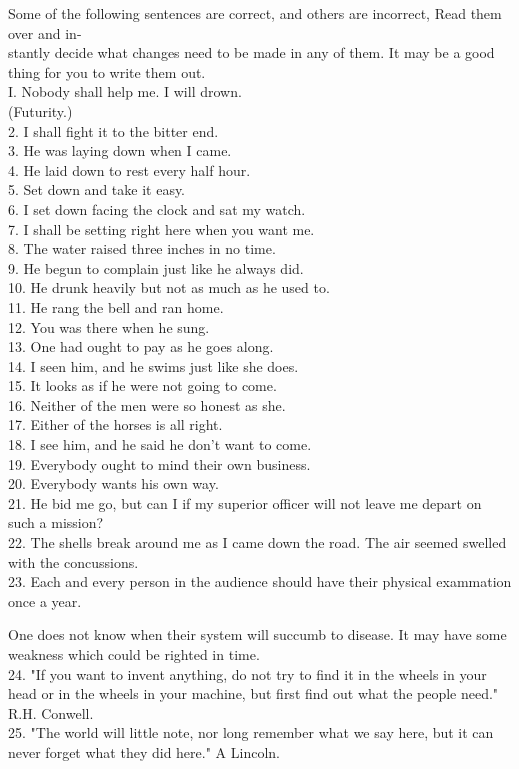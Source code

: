 \documentclass[10pt]{article}
\begin{document}
Some of the following sentences are correct, and others are incorrect, Read them over and in-\\
stantly decide what changes need to be made in any of them. It may be a good thing for you to write them out.\\
I. Nobody shall help me. I will drown.\\
(Futurity.)\\
2. I shall fight it to the bitter end.\\
3. He was laying down when I came.\\
4. He laid down to rest every half hour.\\
5. Set down and take it easy.\\
6. I set down facing the clock and sat my watch.\\
7. I shall be setting right here when you want me.\\
8. The water raised three inches in no time.\\
9. He begun to complain just like he always did.\\
10. He drunk heavily but not as much as he used to.\\
11. He rang the bell and ran home.\\
12. You was there when he sung.\\
13. One had ought to pay as he goes along.\\
14. I seen him, and he swims just like she does.\\
15. It looks as if he were not going to come.\\
16. Neither of the men were so honest as she.\\
17. Either of the horses is all right.\\
18. I see him, and he said he don't want to come.\\
19. Everybody ought to mind their own business.\\
20. Everybody wants his own way.\\
21. He bid me go, but can I if my superior officer will not leave me depart on such a mission?\\
22. The shells break around me as I came down the road. The air seemed swelled with the concussions.\\
23. Each and every person in the audience should have their physical exammation once a year.

One does not know when their system will succumb to disease. It may have some weakness which could be righted in time.\\
24. "If you want to invent anything, do not try to find it in the wheels in your head or in the wheels in your machine, but first find out what the people need." R.H. Conwell.\\
25. "The world will little note, nor long remember what we say here, but it can never forget what they did here." A Lincoln.
\end{document}

